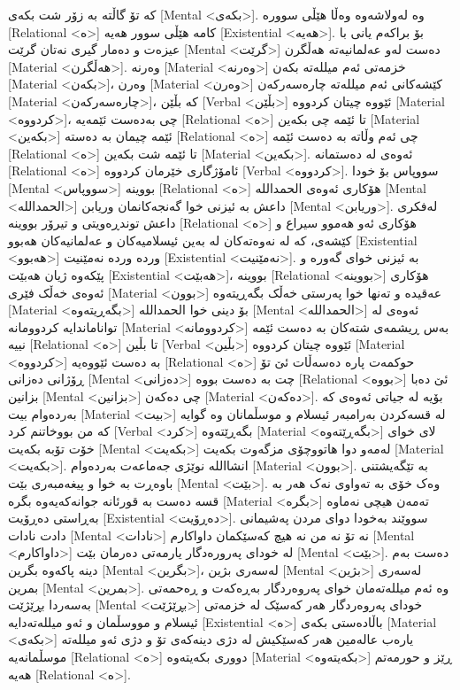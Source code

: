 کە تۆ گاڵتە بە زۆر شت بکەی [Mental <بکەی>]. وە لەولاشەوە وەڵا هێڵی سووره [Relational <ه>] کامە هێڵی سوور هەیە [Existential <هەیە>]. بۆ براکەم یانی با عیزەت و دەمار گیری نەتان گرێت [Mental <گرێت>] دەست لەو عەلمانیەتە هەڵگرن [Material <هەڵگرن>]. وەرنە [Material <وەرنە>] خزمەتی ئەم میللەتە بکەن [Material <بکەن>]، وەرن [Material <وەرن>] کێشەکانی ئەم میللەتە چارەسەرکەن [Material <چارەسەرکەن>]، کە بڵێن [Verbal <بڵێن>] ئێووە چیتان کردووە [Material <کردووە>]، چی بەدەست ئێمەیە [Relational <ە>] تا ئێمە چی بکەین [Material <بکەین>] ئێمە چیمان بە دەستە [Relational <ە>] چی ئەم وڵاتە بە دەست ئێمە [Relational <ە>] تا ئێمە شت بکەین [Material <بکەین>]. ئەوەی لە دەستمانە [Relational <ە>] ئامۆژگاری خێرمان کردووە [Verbal <کردووە>]. سووپاس بۆ خودا [Mental <سووپاس>] بووینە [Relational <ە>] هۆکاری ئەوەی الحمداللە [Mental <الحمداللە>] داعش بە ئیزنی خوا گەنجەکانمان وریابن [Mental <وریابن>].
لەفکری داعش توندڕەویتی و تیرۆر بووینە [Relational <ە>] هۆکاری ئەو هەموو سیراع و کێشەی، کە لە نەوەتەکان لە بەین ئیسلامیەکان و عەلمانیەکان هەبوو [Existential <هەبوو>] وردە وردە نەمێنیت [Existential <نەمێنیت>]. بە ئیزنی خوای گەورە و پێکەوە ژیان هەبێت [Existential <هەبێت>]، بووینە [Relational <بووینە>] هۆکاری ئەوەی خەڵک فێری [Material <بوون>] عەقیدە و تەنها خوا پەرستی خەڵک بگەڕیتەوە [Material <بگەڕیتەوە>] بۆ دینی خوا الحمداللە [Mental <الحمداللە>] ئەوەی لە تواناماندایە کردوومانە [Material <کردوومانە>] بەس ڕیشمەی شتەکان بە دەست ئێمە نییە [Relational <ە>] تا بڵین [Verbal <بڵین>] ئێووە چیتان کردووە [Material <کردووە>] بە دەست ئێووەیە [Relational <ە>] حوکمەت پارە دەسەڵات ئێ تۆ ڕۆژانی دەزانی [Mental <دەزانی>] چت بە دەست بووە [Relational <بووە>] ئێ دەبا بزانین [Mental <بزانین>] چی دەکەن [Material <دەکەن>].
بۆیە لە جیاتی ئەوەی کە بەردەوام بیت [Material <بیت>] لە قسەکردن بەرامبەر ئیسلام و موسڵمانان وە گوایە کە من بووخاتنم کرد [Verbal <کرد>] بگەڕێتەوە [Material <بگەڕێتەوە>] لای خوای خۆت تۆبە بکەیت [Mental <بکەیت>] لەمەو دوا هاتووچۆی مزگەوت بکەیت [Material <بکەیت>]. انشااللە نوێژی جەماعەت بەردەوام [Material <بوون>].
بە تێگەیشتنی باوەڕت بە خوا و پیغەمبەری بێت [Mental <بێت>]. وەک خۆی بە تەواوی نەک هەر بە قسە دەست بە قورئانە جوانەکەیەوە بگرە [Material <بگرە>] تەمەن هیچی نەماوە بەڕاستی دەڕۆیت [Existential <دەڕۆیت>]. سووێند بەخودا دوای مردن پەشیمانی دادت نادات [Mental <نادات>] نە تۆ نە من نە هیچ کەسێکمان داواکارم [Mental <داواکارم>] لە خودای پەرورەدگار یارمەتی دەرمان بێت [Mental <بێت>]. دەست بەم دینە پاکەوە بگرین [Mental <بگرین>]، لەسەری بژین [Mental <بژین>] لەسەری بمرین [Mental <بمرین>]. وە ئەم میللەتەمان خوای پەروەردگار بەڕەکەت و ڕەحمەتی بەسەردا بڕێژێت [Mental <بڕێژێت>] خودای پەروەردگار هەر کەسێک لە خزمەتی ئیسلام و مووسڵمان و ئەو میللەتەدایە [Existential <ە>] باڵادەستی بکەی [Material <بکەی>] یارەب عالەمین هەر کەسێکیش لە دژی دینەکەی تۆ و دژی ئەو میللەتە موسڵمانەیە [Relational <ە>] دووری بکەیتەوە [Material <بکەیتەوە>] ڕێز و حورمەتم هەیە [Relational <ە>].

